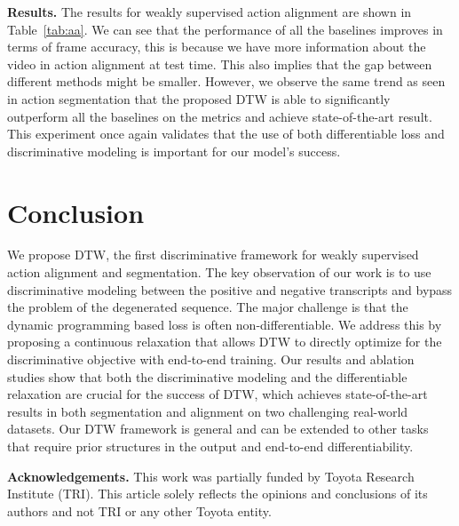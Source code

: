 \documentclass[10pt,twocolumn,letterpaper]{article}
\newcommand{\dttw}{DTW\xspace}
\begin{document}
\vspace{1mm}
{\noindent \bf Results.} The results for weakly supervised action alignment are shown in Table~\ref{tab:aa}. We can see that the performance of all the baselines improves in terms of frame accuracy, this is because we have more information about the video in action alignment at test time. This also implies that the gap between different methods might be smaller. However, we observe the same trend as seen in action segmentation that the proposed \dttw is able to significantly outperform all the baselines on the metrics and achieve state-of-the-art result. This experiment once again validates that the use of both differentiable loss and discriminative modeling is important for our model's success. \section{Conclusion}
\label{sec:conclusion}

We propose \dttw, the first discriminative framework for weakly supervised action alignment and segmentation. The key observation of our work is to use discriminative modeling between the positive and negative transcripts and bypass the problem of the degenerated sequence. The major challenge is that the dynamic programming based loss is often non-differentiable. We address this by proposing a continuous relaxation that allows \dttw to directly optimize for the discriminative objective with end-to-end training. Our results and ablation studies show that both the discriminative modeling and the differentiable relaxation are crucial for the success of \dttw, which achieves state-of-the-art results in both segmentation and alignment on two challenging real-world datasets. Our \dttw framework is general and can be extended to other tasks that require prior structures in the output and end-to-end differentiability.

\vspace{+2mm}
{\noindent \bf Acknowledgements.}
This work was partially funded by Toyota Research Institute (TRI). This article solely reflects the opinions and conclusions of its authors and not TRI or any other Toyota entity. 
\end{document}
